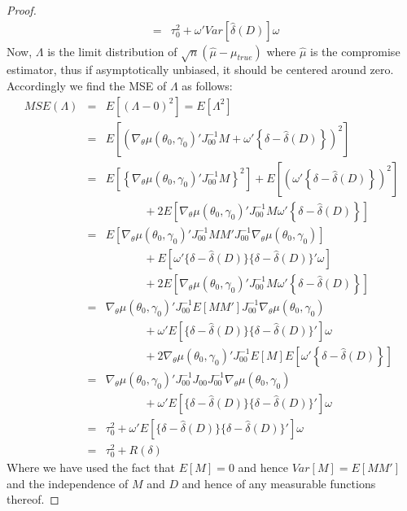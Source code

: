 \begin{proof}
\begin{eqnarray*}
			&=& \tau^2_0 + \omega'Var\left[\hat{\delta}(D)  \right]\omega
\end{eqnarray*}
Now, $\Lambda$ is the limit distribution of $\sqrt{n}(\hat{\mu}-\mu_{true})$ where $\hat{\mu}$ is the compromise estimator, thus if asymptotically unbiased, it should be centered around zero. Accordingly we find the MSE of $\Lambda$ as follows:
	\begin{eqnarray*}
		MSE(\Lambda) &=& E\left[(\Lambda - 0)^2  \right] = E\left[\Lambda^2  \right]\\
					&=& E\left[\left( \nabla_\theta \mu(\theta_0,\gamma_0)' J_{00}^{-1} M + \omega' \left\{\delta - \hat{\delta}(D)\right\}\right)^2 \right]\\
					&=& E\left[\left\{\nabla_\theta \mu(\theta_0,\gamma_0)' J_{00}^{-1} M \right\}^2\right] + E\left[\left(\omega' \left\{\delta - \hat{\delta}(D)\right\}\right)^2 \right]\\
		&& \;\;\;\;\;\;\;\;\;\;\;\;+ 2E \left[\nabla_\theta \mu(\theta_0,\gamma_0)' J_{00}^{-1} M \omega' \left\{\delta - \hat{\delta}(D)\right\} \right]\\
		&=& E\left[\nabla_\theta \mu(\theta_0,\gamma_0)' J_{00}^{-1} M M' J_{00}^{-1}\nabla_\theta \mu(\theta_0,\gamma_0)\right]\\
			&& \;\;\;\;\;\;\;\;\;\;\;\; + E\left[\omega' \{\delta - \hat{\delta}(D)\}\{\delta - \hat{\delta}(D)\}' \omega\right]\\
		&& \;\;\;\;\;\;\;\;\;\;\;\;+ 2E \left[\nabla_\theta \mu(\theta_0,\gamma_0)' J_{00}^{-1} M \omega' \left\{\delta - \hat{\delta}(D)\right\} \right]\\
		&=&\nabla_\theta \mu(\theta_0,\gamma_0)' J_{00}^{-1} E\left[M M' \right]J_{00}^{-1}\nabla_\theta \mu(\theta_0,\gamma_0)\\
			&& \;\;\;\;\;\;\;\;\;\;\;\; +\omega'  E\left[\{\delta - \hat{\delta}(D)\}\{\delta - \hat{\delta}(D)\}' \right]\omega\\
		&& \;\;\;\;\;\;\;\;\;\;\;\;+ 2\nabla_\theta \mu(\theta_0,\gamma_0)' J_{00}^{-1}E \left[ M\right]E\left[ \omega' \left\{\delta - \hat{\delta}(D)\right\} \right]\\
		&=&\nabla_\theta \mu(\theta_0,\gamma_0)' J_{00}^{-1} J_{00}J_{00}^{-1}\nabla_\theta \mu(\theta_0,\gamma_0)\\
			&& \;\;\;\;\;\;\;\;\;\;\;\; +\omega'  E\left[\{\delta - \hat{\delta}(D)\}\{\delta - \hat{\delta}(D)\}' \right]\omega\\
		&=&\tau_0^2+\omega'  E\left[\{\delta - \hat{\delta}(D)\}\{\delta - \hat{\delta}(D)\}' \right]\omega\\
	&=& \tau^2_0 + R(\delta)
\end{eqnarray*}
Where we have used the fact that $E[M]=0$ and hence $Var[M] = E[MM']$ and the independence of $M$ and $D$ and hence of any measurable functions thereof.
\end{proof}

